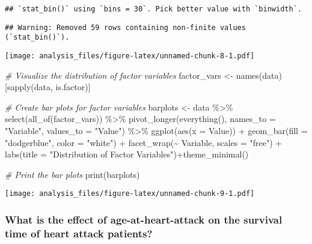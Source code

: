 \documentclass[
]{article}
\newenvironment{Shaded}{\begin{snugshade}}{\end{snugshade}}
\newcommand{\AttributeTok}[1]{\textcolor[rgb]{0.77,0.63,0.00}{#1}}
\newcommand{\CommentTok}[1]{\textcolor[rgb]{0.56,0.35,0.01}{\textit{#1}}}
\newcommand{\FunctionTok}[1]{\textcolor[rgb]{0.00,0.00,0.00}{#1}}
\newcommand{\NormalTok}[1]{#1}
\newcommand{\OtherTok}[1]{\textcolor[rgb]{0.56,0.35,0.01}{#1}}
\newcommand{\SpecialCharTok}[1]{\textcolor[rgb]{0.00,0.00,0.00}{#1}}
\newcommand{\StringTok}[1]{\textcolor[rgb]{0.31,0.60,0.02}{#1}}
\begin{document}
\begin{verbatim}
## `stat_bin()` using `bins = 30`. Pick better value with `binwidth`.
\end{verbatim}

\begin{verbatim}
## Warning: Removed 59 rows containing non-finite values (`stat_bin()`).
\end{verbatim}

\texttt{[image: analysis\_files/figure-latex/unnamed-chunk-8-1.pdf]}

\begin{Shaded}
\begin{Highlighting}[]
\CommentTok{\# Visualize the distribution of factor variables}
\NormalTok{factor\_vars }\OtherTok{\textless{}{-}} \FunctionTok{names}\NormalTok{(data)[}\FunctionTok{sapply}\NormalTok{(data, is.factor)]}

\CommentTok{\# Create bar plots for factor variables}
\NormalTok{barplots }\OtherTok{\textless{}{-}}\NormalTok{ data }\SpecialCharTok{\%\textgreater{}\%}
  \FunctionTok{select}\NormalTok{(}\FunctionTok{all\_of}\NormalTok{(factor\_vars)) }\SpecialCharTok{\%\textgreater{}\%}
  \FunctionTok{pivot\_longer}\NormalTok{(}\FunctionTok{everything}\NormalTok{(), }\AttributeTok{names\_to =} \StringTok{"Variable"}\NormalTok{, }\AttributeTok{values\_to =} \StringTok{"Value"}\NormalTok{) }\SpecialCharTok{\%\textgreater{}\%}
  \FunctionTok{ggplot}\NormalTok{(}\FunctionTok{aes}\NormalTok{(}\AttributeTok{x =}\NormalTok{ Value)) }\SpecialCharTok{+}
  \FunctionTok{geom\_bar}\NormalTok{(}\AttributeTok{fill =} \StringTok{"dodgerblue"}\NormalTok{, }\AttributeTok{color =} \StringTok{"white"}\NormalTok{) }\SpecialCharTok{+}
  \FunctionTok{facet\_wrap}\NormalTok{(}\SpecialCharTok{\textasciitilde{}}\NormalTok{ Variable, }\AttributeTok{scales =} \StringTok{"free"}\NormalTok{) }\SpecialCharTok{+}
  \FunctionTok{labs}\NormalTok{(}\AttributeTok{title =} \StringTok{"Distribution of Factor Variables"}\NormalTok{)}\SpecialCharTok{+}\FunctionTok{theme\_minimal}\NormalTok{()}

\CommentTok{\# Print the bar plots}
\FunctionTok{print}\NormalTok{(barplots)}
\end{Highlighting}
\end{Shaded}

\texttt{[image: analysis\_files/figure-latex/unnamed-chunk-9-1.pdf]}

\hypertarget{what-is-the-effect-of-age-at-heart-attack-on-the-survival-time-of-heart-attack-patients}{%
\subsubsection{What is the effect of age-at-heart-attack on the survival
time of heart attack
patients?}\label{what-is-the-effect-of-age-at-heart-attack-on-the-survival-time-of-heart-attack-patients}}
\end{document}
